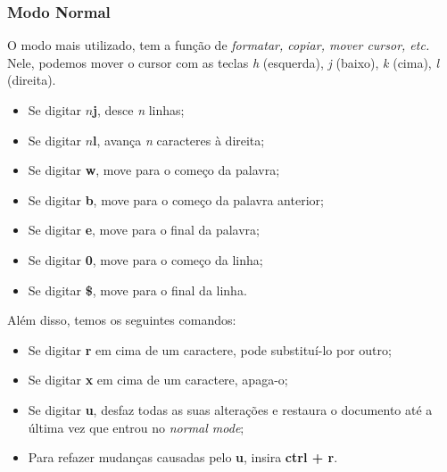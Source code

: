 \documentclass[12pt]{article}
\begin{document}
		\subsubsection{Modo Normal}									
		O modo mais utilizado, tem a função de \emph{formatar, copiar, mover cursor, etc.} Nele, podemos mover o cursor com as teclas \emph{h} (esquerda), \emph{j} (baixo), \emph{k} (cima), \emph{l} (direita).
		\begin{itemize}
			\item Se digitar \textbf{$n$j}, desce \emph{n} linhas;
			\item Se digitar \textbf{$n$l}, avança \emph{n} caracteres à direita;
			\item Se digitar \textbf{w}, move para o começo da palavra;
			\item Se digitar \textbf{b}, move para o começo da palavra anterior;
			\item Se digitar \textbf{e}, move para o final da palavra;
			\item Se digitar \textbf{0}, move para o começo da linha;
			\item Se digitar \textbf{\$}, move para o final da linha.	
		\end{itemize} 
		Além disso, temos os seguintes comandos:
		\begin{itemize}
			\item Se digitar \textbf{r} em cima de um caractere, pode substituí-lo por outro;
			\item Se digitar \textbf{x} em cima de um caractere, apaga-o;
			\item Se digitar \textbf{u}, desfaz todas as suas alterações e restaura o documento até a última vez que entrou no \emph{normal mode};
			\item Para refazer mudanças causadas pelo \textbf{u}, insira \textbf{ctrl + r}.
		\end{itemize}
\end{document}
